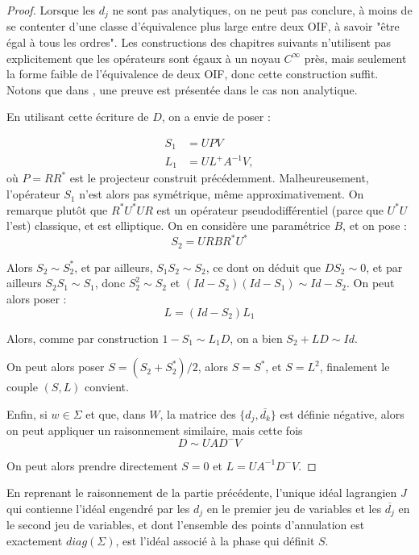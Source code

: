 \begin{proof}
  Lorsque les $d_j$ ne sont pas analytiques, on ne peut pas conclure, à moins de se contenter d'une classe d'équivalence plus large entre deux OIF, à savoir "être égal à tous les ordres". Les constructions des chapitres suivants n'utilisent pas explicitement que les opérateurs sont égaux à un noyau $C^{\infty}$ près, mais seulement la forme faible de l'équivalence de deux OIF, donc cette construction suffit. Notons que dans \cite{BoutetdeMonvel1974-1975}, une preuve est présentée dans le cas non analytique.
  
  En utilisant cette écriture de $D$, on a envie de poser :
  
  \begin{align*}
    S_1 &= UPV\\
    L_1 &= UL^+A^{-1}V,
  \end{align*}
où $P=RR^*$ est le projecteur construit précédemment. Malheureusement, l'opérateur $S_1$ n'est alors pas symétrique, même approximativement. On remarque plutôt que $R^*U^*UR$ est un opérateur pseudodifférentiel (parce que $U^*U$ l'est) classique, et est elliptique. On en considère une paramétrice $B$, et on pose :
  \begin{equation*}
    S_2=URBR^*U^*
  \end{equation*}
  
  Alors $S_2 \sim S_2^*$, et par ailleurs, $S_1S_2 \sim S_2$, ce dont on déduit que $DS_2 \sim 0$, et par ailleurs $S_2S_1 \sim S_1$, donc $S_2^2 \sim S_2$ et $(Id-S_2)(Id-S_1) \sim Id-S_2$. On peut alors poser :
  \begin{equation*}
    L=(Id-S_2)L_1
  \end{equation*}
  
  Alors, comme par construction $1-S_1 \sim L_1D$, on a bien $S_2 + LD \sim Id$.
  
  On peut alors poser $S=(S_2+S_2^*)/2$, alors $S=S^*$, et $S=L^2$, finalement le couple $(S,L)$ convient.
  
  Enfin, si $w \in \Sigma$ et que, dans $W$, la matrice des $\{d_j,\overline{d_k}\}$ est définie négative, alors on peut appliquer un raisonnement similaire, mais cette fois
  \begin{equation*}
    D \sim UAD^-V
  \end{equation*}
  
  On peut alors prendre directement $S=0$ et $L=UA^{-1}D^-V$.
  \end{proof}
  
  En reprenant le raisonnement de la partie précédente, l'unique idéal lagrangien $J$ qui contienne l'idéal engendré par les $d_j$ en le premier jeu de variables et les $\overline{d_j}$ en le second jeu de variables, et dont l'ensemble des points d'annulation est exactement $diag(\Sigma)$, est l'idéal associé à la phase qui définit $S$.
